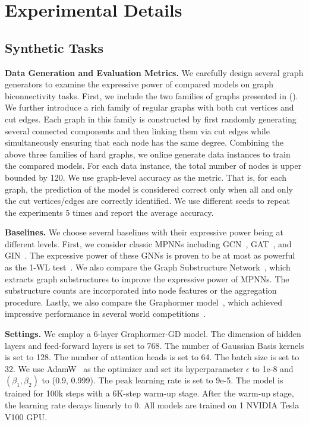 \documentclass{article} %
\let\cref\crtcref
\begin{document}
\section{Experimental Details}

\subsection{Synthetic Tasks}
\label{sec:synthetic_detail}
\textbf{Data Generation and Evaluation Metrics.} 
We carefully design several graph generators to examine the expressive power of compared models on graph biconnectivity tasks. First, we include the two families of graphs presented in \cref{example:1,example:2} (\cref{sec:counterexample_proof}). We further introduce a rich family of regular graphs with both cut vertices and cut edges. Each graph in this family is constructed by first randomly generating several connected components and then linking them via cut edges while simultaneously ensuring that each node has the same degree. Combining the above three families of hard graphs, we online generate data instances to train the compared models. For each data instance, the total number of nodes is upper bounded by 120. We use graph-level accuracy as the metric. That is, for each graph, the prediction of the model is considered correct only when all and only the cut vertices/edges are correctly identified. We use different seeds to repeat the experiments 5 times and report the average accuracy.

\textbf{Baselines.} We choose several baselines with their expressive power being at different levels. First, we consider classic MPNNs including GCN~\citep{kipf2017semisupervised}, GAT~\citep{velivckovic2018graph}, and GIN~\citep{bouritsas2022improving}. The expressive power of these GNNs is proven to be at most as powerful as the 1-WL test~\citep{xu2019powerful}. We also compare the Graph Substructure Network~\citep{bouritsas2022improving}, which extracts graph substructures to improve the expressive power of MPNNs. The substructure counts are incorporated into node features or the aggregation procedure. Lastly, we also compare the Graphormer model~\citep{ying2021transformers}, which achieved impressive performance in several world competitions~\citep{ying2021first,shi2022benchmarking,luo2022one}.

\textbf{Settings.} 
We employ a 6-layer Graphormer-GD model. The dimension of hidden layers and feed-forward layers is set to 768. The number of Gaussian Basis kernels is set to 128. The number of attention heads is set to 64. The batch size is set to 32. We use AdamW~\citep{kingma2014adam} as the optimizer and set its hyperparameter $\epsilon$ to 1e-8 and $(\beta_1,\beta_2)$ to (0.9, 0.999). The peak learning rate is set to 9e-5. The model is trained for 100k steps with a 6K-step warm-up stage. After the warm-up stage, the learning rate decays linearly to 0. All models are trained on 1 NVIDIA Tesla V100 GPU.
\end{document}
